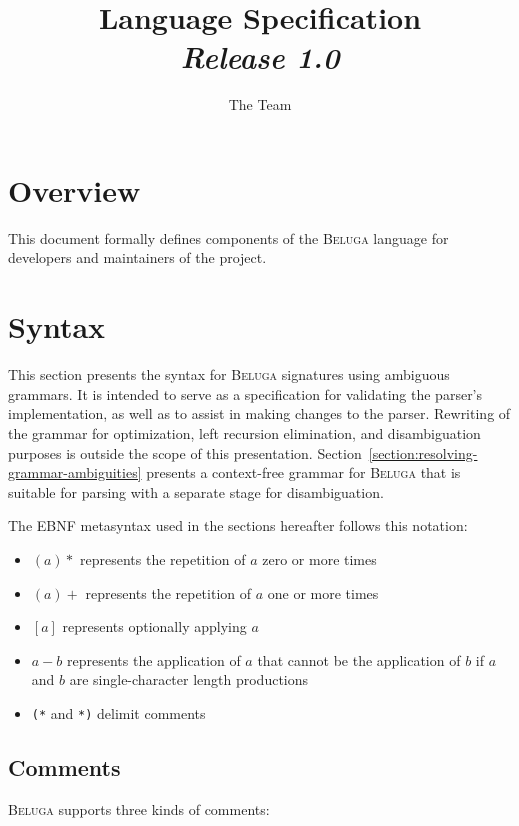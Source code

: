 \documentclass[11pt]{article}
\title{%
\Beluga Language Specification%
\\\Large\textit{Release 1.0}
}
\author{The \Beluga Team}
\newcommand{\Beluga}{\textsc{Beluga}\xspace}
\begin{document}
\maketitle

\tableofcontents

\section*{Overview}

This document formally defines components of the \Beluga language for developers and maintainers of the project.

\section{Syntax}\label{section:syntax}

This section presents the syntax for \Beluga signatures using ambiguous grammars.
It is intended to serve as a specification for validating the parser's implementation, as well as to assist in making changes to the parser.
Rewriting of the grammar for optimization, left recursion elimination, and disambiguation purposes is outside the scope of this presentation.
Section~\ref{section:resolving-grammar-ambiguities} presents a context-free grammar for \Beluga that is suitable for parsing with a separate stage for disambiguation.

The EBNF metasyntax used in the sections hereafter follows this notation:

\begin{itemize}
\item $ (a)* $ represents the repetition of $ a $ zero or more times
\item $ (a)+ $ represents the repetition of $ a $ one or more times
\item $ [a] $ represents optionally applying $ a $
\item $ a - b $ represents the application of $ a $ that cannot be the application of $ b $ if $ a $ and $ b $ are single-character length productions
\item \texttt{(*} and \texttt{*)} delimit comments
\end{itemize}

\subsection{Comments}

\Beluga supports three kinds of comments:
\end{document}
